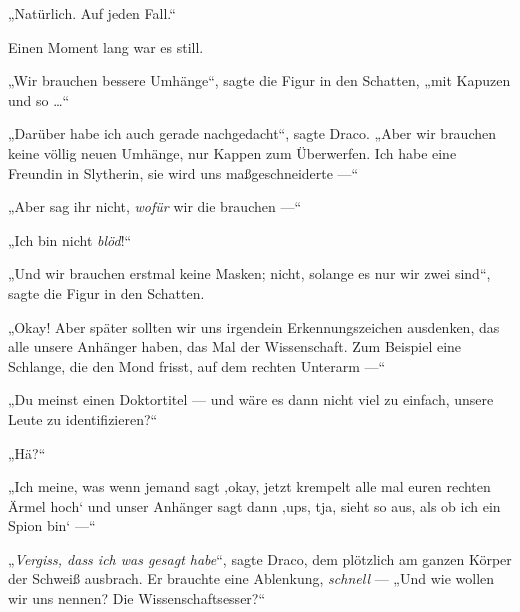 „Natürlich. Auf jeden Fall.“

Einen Moment lang war es still.

„Wir brauchen bessere Umhänge“, sagte die Figur in den Schatten, „mit Kapuzen und so …“

„Darüber habe ich auch gerade nachgedacht“, sagte Draco.
„Aber wir brauchen keine völlig neuen Umhänge, nur Kappen zum Überwerfen. Ich habe eine Freundin in Slytherin, sie wird uns maßgeschneiderte —“

„Aber sag ihr nicht, \emph{wofür} wir die brauchen —“

„Ich bin nicht \emph{blöd}!“

„Und wir brauchen erstmal keine Masken; nicht, solange es nur wir zwei sind“, sagte die Figur in den Schatten.

„Okay! Aber später sollten wir uns irgendein Erkennungszeichen ausdenken, das alle unsere Anhänger haben, das Mal der Wissenschaft. Zum Beispiel eine Schlange, die den Mond frisst, auf dem rechten Unterarm —“

„Du meinst einen Doktortitel — und wäre es dann nicht viel zu einfach, unsere Leute zu identifizieren?“

„Hä?“

„Ich meine, was wenn jemand sagt ‚okay, jetzt krempelt alle mal euren rechten Ärmel hoch‘ und unser Anhänger sagt dann ‚ups, tja, sieht so aus, als ob ich ein Spion bin‘ —“

„\emph{Vergiss, dass ich was gesagt habe}“, sagte Draco, dem plötzlich am ganzen Körper der Schweiß ausbrach. Er brauchte eine Ablenkung, \emph{schnell} —
„Und wie wollen wir uns nennen? Die Wissenschaftsesser?“

